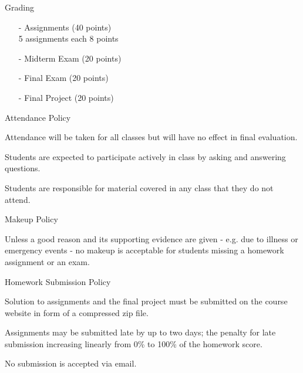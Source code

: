 \documentclass[compress]{beamer}
\begin{document}
\begin{slide}
	\begin{block}{Grading}

	\begin{itemize}
	\item[-] Assignments (40 points)\\5 assignments each 8 points
	\item[-] Midterm Exam (20 points)
	\item[-] Final Exam (20 points)
	\item[-] Final Project (20 points)
	\end{itemize}

	\end{block}
\end{slide}

\begin{slide}
	\begin{block}{Attendance Policy}

	Attendance will be taken for all classes but will have no effect in final evaluation.

	Students are expected to participate actively in class by asking and answering questions.

	Students are responsible for material covered in any class that they do not attend.

	\end{block}
\end{slide}

\begin{slide}
	\begin{block}{Makeup Policy}

	Unless a good reason and its supporting evidence are given - e.g. due to illness or emergency events - no makeup is acceptable for students missing a homework assignment or an exam.

	\end{block}
\end{slide}

\begin{slide}
	\begin{block}{Homework Submission Policy}

	Solution to assignments and the final project must be submitted on the course website in form of a compressed zip file.

	Assignments may be submitted late by up to two days; the penalty for late submission increasing linearly from 0\% to 100\% of the homework score.

	No submission is accepted via email.

	\end{block}
\end{slide}
\end{document}
